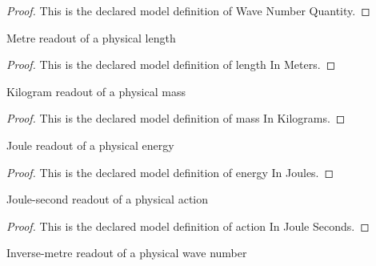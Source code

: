 \begin{proof}
  This is the declared model definition of Wave Number Quantity.
\end{proof}
\begin{definition}
  \label{def:physics:phyx-mini-0521:phyxminiproblems-problemphyxmini0521-lengthinmeters}
  Metre readout of a physical length
\end{definition}
\begin{proof}
  This is the declared model definition of length In Meters.
\end{proof}
\begin{definition}
  \label{def:physics:phyx-mini-0521:phyxminiproblems-problemphyxmini0521-massinkilograms}
  Kilogram readout of a physical mass
\end{definition}
\begin{proof}
  This is the declared model definition of mass In Kilograms.
\end{proof}
\begin{definition}
  \label{def:physics:phyx-mini-0521:phyxminiproblems-problemphyxmini0521-energyinjoules}
  Joule readout of a physical energy
\end{definition}
\begin{proof}
  This is the declared model definition of energy In Joules.
\end{proof}
\begin{definition}
  \label{def:physics:phyx-mini-0521:phyxminiproblems-problemphyxmini0521-actioninjouleseconds}
  Joule-second readout of a physical action
\end{definition}
\begin{proof}
  This is the declared model definition of action In Joule Seconds.
\end{proof}
\begin{definition}
  \label{def:physics:phyx-mini-0521:phyxminiproblems-problemphyxmini0521-wavenumberininversemeters}
  Inverse-metre readout of a physical wave number
\end{definition}
